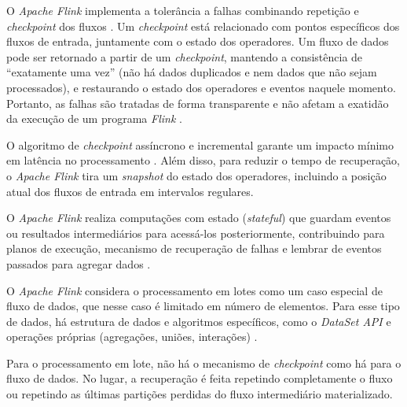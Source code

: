 O \emph{Apache Flink} implementa a tolerância a falhas combinando repetição e
\emph{checkpoint} dos fluxos \cite{Carbone2015,ApacheFlink2020}.
Um \emph{checkpoint} está relacionado com pontos específicos dos fluxos de
entrada, juntamente com o estado dos operadores.
Um fluxo de dados pode ser retornado a partir de um \emph{checkpoint}, mantendo
a consistência de ``exatamente uma vez'' (não há dados duplicados e nem dados que
não sejam processados), e restaurando o estado dos operadores e eventos naquele
momento.
Portanto, as falhas são tratadas de forma transparente e não afetam a exatidão
da execução de um programa \emph{Flink} \cite{ApacheFlink2020}.

O algoritmo de \emph{checkpoint} assíncrono e incremental garante um impacto
mínimo em latência no processamento \cite{Carbone2015}.
Além disso, para reduzir o tempo de recuperação, o \emph{Apache Flink} tira um
\emph{snapshot} do estado dos operadores, incluindo a posição atual dos fluxos
de entrada em intervalos regulares.


O \emph{Apache Flink} realiza computações com estado (\emph{stateful}) que guardam
eventos ou resultados intermediários para acessá-los posteriormente,
contribuindo para planos de execução, mecanismo de recuperação de falhas e
lembrar de eventos passados para agregar dados \cite{ApacheFlink2020, Carbone2015}.


O \emph{Apache Flink} considera o processamento em lotes como um caso especial
de fluxo de dados, que nesse caso é limitado em número de elementos.
Para esse tipo de dados, há estrutura de dados e algoritmos específicos, como o
\emph{DataSet API} e operações próprias (agregações, uniões, interações)
\cite{Carbone2015}.

Para o processamento em lote, não há o mecanismo de \emph{checkpoint} como há
para o fluxo de dados.
No lugar, a recuperação é feita repetindo completamente o fluxo ou repetindo as
últimas partições perdidas do fluxo intermediário materializado.





